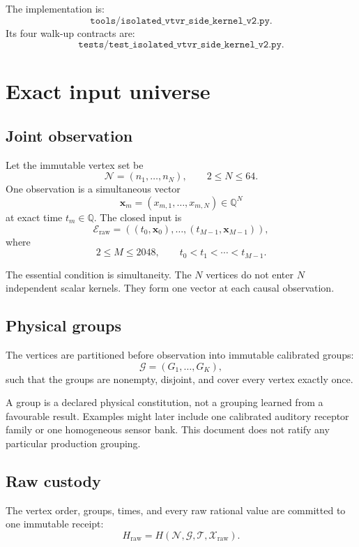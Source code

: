 \documentclass[11pt]{article}
\newcommand{\Q}{\mathbb{Q}}
\newcommand{\Xraw}{\mathbf{x}}
\begin{document}
The implementation is:
\[
  \texttt{tools/isolated\_vtvr\_side\_kernel\_v2.py}.
\]
Its four walk-up contracts are:
\[
  \texttt{tests/test\_isolated\_vtvr\_side\_kernel\_v2.py}.
\]

\section{Exact input universe}

\subsection{Joint observation}

Let the immutable vertex set be
\[
  \mathcal{N}=(n_1,\ldots,n_N),
  \qquad 2\leq N\leq 64.
\]
One observation is a simultaneous vector
\[
  \Xraw_m =
  \left(x_{m,1},\ldots,x_{m,N}\right)\in\Q^N
\]
at exact time \(t_m\in\Q\). The closed input is
\[
  \mathcal{E}_{\mathrm{raw}}
  =
  \left((t_0,\Xraw_0),\ldots,(t_{M-1},\Xraw_{M-1})\right),
\]
where
\[
  2\leq M\leq 2048,
  \qquad
  t_0<t_1<\cdots<t_{M-1}.
\]

The essential condition is simultaneity. The \(N\) vertices do not enter
\(N\) independent scalar kernels. They form one vector at each causal
observation.

\subsection{Physical groups}

The vertices are partitioned before observation into immutable calibrated
groups:
\[
  \mathcal{G}=(G_1,\ldots,G_K),
\]
such that the groups are nonempty, disjoint, and cover every vertex exactly
once.

A group is a declared physical constitution, not a grouping learned from a
favourable result. Examples might later include one calibrated auditory
receptor family or one homogeneous sensor bank. This document does not ratify
any particular production grouping.

\subsection{Raw custody}

The vertex order, groups, times, and every raw rational value are committed to
one immutable receipt:
\[
  H_{\mathrm{raw}}
  =
  H\!\left(
    \mathcal{N},
    \mathcal{G},
    \mathcal{T},
    \mathcal{X}_{\mathrm{raw}}
  \right).
\]
\end{document}
